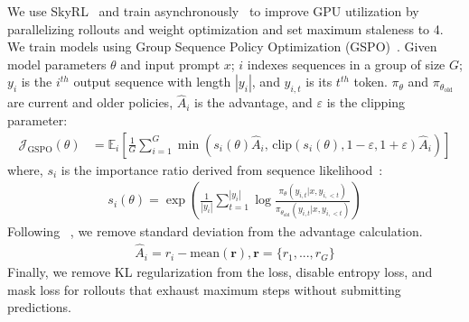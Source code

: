 We use SkyRL~\citep{griggs2025skrylv01} and train asynchronously~\citep{fu2026areallargescaleasynchronousreinforcement} to improve GPU utilization by parallelizing rollouts and weight optimization and set maximum staleness to 4. 
We train models using Group Sequence Policy Optimization (GSPO)~\citep{zheng2025groupsequencepolicyoptimization}. Given model parameters $\theta$ and input prompt $x$; $i$ indexes sequences in a group of size $G$; $y_i$ is the $i^{th}$ output sequence with length $|y_i|$, and $y_{i,t}$ is its $t^{th}$ token. $\pi_\theta$ and $\pi_{\theta_{\text{old}}}$ are current and older policies, $\hat{A}_i$ is the advantage, and $\varepsilon$ is the clipping parameter:
{
\small %
\begin{align}
    \mathcal{J}_{\text{GSPO}}(\theta) &= 
    \mathbb{E}_i \left[ \frac{1}{G} \sum_{i=1}^{G} \min\left( s_i(\theta) \hat{A}_i,\, \text{clip}\left( s_i(\theta), 1-\varepsilon, 1+\varepsilon \right) \hat{A}_i \right) \right]
    \label{eq:gspo}
\end{align}
}
where,  $s_i$ is the importance ratio derived from sequence likelihood~\citep{zheng-etal-2023-click}:
\begin{align}
    s_i(\theta) = \exp\left( \frac{1}{|y_i|} \sum_{t=1}^{|y_i|} \log \frac{\pi_\theta(y_{i,t} | x, y_{i,<t})}{\pi_{\theta_{\text{old}}}(y_{i,t} | x, y_{i,<t})} \right)
    \label{eq:is}
\end{align}
Following ~\citet{liu2025understandingr1zeroliketrainingcritical}, we remove standard deviation from the advantage calculation.
\begin{align}
    \hat{A}_i = r_i - \text{mean}(\mathbf{r}), \mathbf{r} = \{r_1, ..., r_G\}
\end{align}
Finally, we remove KL regularization from the loss, disable entropy loss, and mask loss for rollouts that exhaust maximum steps without submitting predictions. %